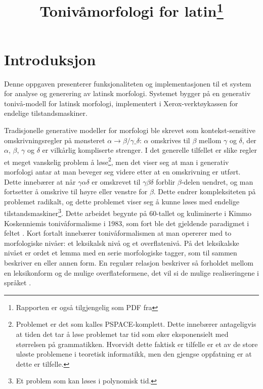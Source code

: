 \documentclass{article}
\title{Toniv\aa{}morfologi for latin\footnote{Rapporten er ogs\aa{}
tilgjengelig som PDF fra \link{http://heim.ifi.uio.no/arnskj/latin/report.pdf}}}
\date{} %
\begin{document}
\maketitle

\section{Introduksjon}
Denne oppgaven presenterer funksjonaliteten og implementasjonen til et system
for analyse og generering av latinsk morfologi. Systemet bygger p\aa{} en
generativ toniv\aa{}-modell for latinsk morfologi, implementert i
Xerox-verkt\o{}y\-kassen for endelige tilstandsmaskiner.

Tradisjonelle generative modeller for morfologi ble skrevet som
kontekst-sensitive omskrivningsregler p\aa{} m\o{}nsteret $\alpha \to
\beta/\gamma \_ \delta$: $\alpha$ omskrives til $\beta$ mellom $\gamma$ og
$\delta$, der $\alpha$, $\beta$, $\gamma$ og $\delta$ er vilk\aa{}rlig
kompliserte strenger. I det generelle tilfellet er slike regler et meget
vanskelig problem \aa{} l\o{}se\footnote{Problemet er det som kalles
PSPACE-komplett. Dette inneb\ae{}rer antageligvis at tiden det tar \aa{}
l\o{}se problemet tar tid som \o{}ker eksponensielt med st\o{}rrelsen p\aa{}
grammatikken. Hvorvidt dette faktisk er tilfelle er et av de store ul\o{}ste
problemene i teoretisk informatikk, men den gjengse oppfatning er at dette er
tilfelle.}, men det viser seg at man i generativ morfologi antar at man
beveger seg videre etter at en omskrivning er utf\o{}rt. Dette inneb\ae{}rer
at n\aa{}r $\gamma\alpha\delta$ er omskrevet til $\gamma\beta\delta$ forblir
$\beta$-delen uendret, og man fortsetter \aa{} omskrive til h\o{}yre eller
venstre for $\beta$. Dette endrer kompleksiteten p\aa{} problemet radikalt, og
dette problemet viser seg \aa{} kunne l\o{}ses med endelige
tilstandsmaskiner\footnote{Et problem som kan l\o{}ses i polynomisk tid.}.
Dette arbeidet begynte p\aa{} 60-tallet og kuliminerte i Kimmo Koskenniemis
toniv\aa{}formalisme i 1983, som fort ble det gjeldende paradigmet i feltet
\cite{twolc}. Kort fortalt inneb\ae{}rer toniv\aa{}formalismen at man opererer
med to morfologiske niv\aa{}er: et leksikalsk niv\aa{} og et
overflateniv\aa{}. P\aa{} det leksikalske niv\aa{}et er ordet et lemma med en
serie morfologiske tagger, som til sammen beskriver en eller annen form. En
regul\ae{}r relasjon beskriver s\aa{} forholdet mellom en leksikonform og de
mulige overflateformene, det vil si de mulige realiseringene i spr\aa{}ket
\cite{jnm}.
\end{document}
